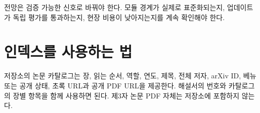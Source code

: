 \documentclass[11pt,openany]{book}
\begin{document}
\begin{translationbox}[이 장을 덮기 전에]

전망은 검증 가능한 신호로 바꿔야 한다. 모듈 경계가 실제로 표준화되는지, 업데이트가 독립 평가를 통과하는지, 현장 비용이 낮아지는지를 계속 확인해야 한다.

\end{translationbox}

\cleardoublepage

\backmatter

\chapter*{인덱스를 사용하는 법}


저장소의 논문 카탈로그는 장, 읽는 순서, 역할, 연도, 제목, 전체 저자, arXiv ID, 베뉴 또는 공개 상태, 초록 URL과 공개 PDF URL을 제공한다. 해설서의 번호와 카탈로그의 장별 항목을 함께 사용하면 된다. 제3자 논문 PDF 자체는 저장소에 포함하지 않는다.
\end{document}

